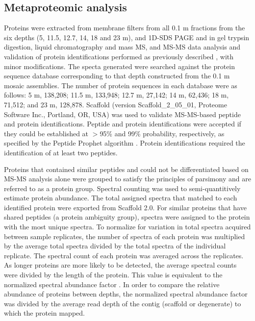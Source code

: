\subsection{Metaproteomic analysis}
Proteins were extracted from membrane filters from all 0.1 \textmu{}m fractions from the six depths (5, 11.5, 12.7, 14, 18 and 23 m), and \ac{1D-SDS PAGE} and in gel trypsin digestion, liquid chromatography and mass \ac{MS}, and \ac{MS-MS} data analysis and validation of protein identifications performed as previously described \cite{Ng2010a}, with minor modifications.
The specta generated were searched against the protein sequence database corresponding to that depth constructed from the 0.1 \textmu{}m mosaic assemblies. 
The number of protein sequences in each database were as follows: 5 m, 138,208; 11.5 m, 133,948; 12.7 m, 27,142; 14 m, 62,436; 18 m, 71,512; and 23 m, 128,878. 
Scaffold (version Scaffold\_2\_05\_01, Proteome Software Inc., Portland, OR, USA) was used to validate \ac{MS-MS}-based peptide and protein identifications. 
Peptide and protein identifications were accepted if they could be established at $>$95\% and 99\% probability, respectively, as specified by the Peptide Prophet algorithm \cite{Keller2002}. 
Protein identifications required the identification of at least two peptides.
 
Proteins that contained similar peptides and could not be differentiated based on \ac{MS-MS} analysis alone were grouped to satisfy the principles of parsimony and are referred to as a protein group. 
Spectral counting was used to semi-quantitively estimate protein abundance. 
The total assigned spectra that matched to each identified protein were exported from Scaffold 2.0. 
For similar proteins that have shared peptides (a protein ambiguity group), spectra were assigned to the protein with the most unique spectra. 
To normalize for variation in total spectra acquired between sample replicates, the number of spectra of each protein was multiplied by the average total spectra divided by the total spectra of the individual replicate. 
The spectral count of each protein was averaged across the replicates. 
As longer proteins are more likely to be detected, the average spectral counts were divided by the length of the protein. 
This value is equivalent to the normalized spectral abundance factor \cite{Florens2006, Zybailov2006}. 
In order to compare the relative abundance of proteins between depths, the normalized spectral abundance factor was divided by the average read depth of the contig (scaffold or degenerate) to which the protein mapped. 

